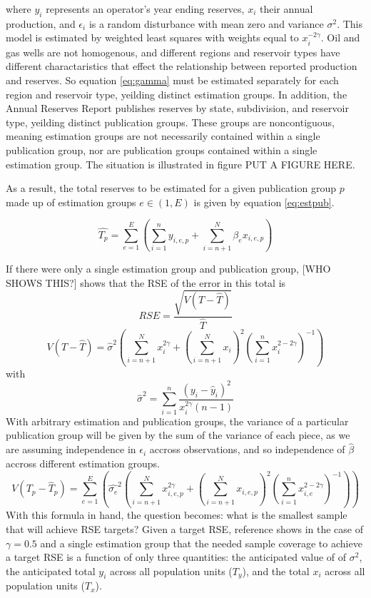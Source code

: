 \documentclass[11pt]{article}\usepackage[]{graphicx}\usepackage[]{color}
\begin{document}
where $y_i$ represents an operator's year ending reserves, $x_i$ their annual production, and $\epsilon_i$ is a random disturbance with mean zero and variance $\sigma^2$. This model is estimated by weighted least squares with weights equal to $x_i^{-2\gamma}$.  Oil and gas wells are not homogenous, and different regions and reservoir types have different charactaristics that effect the relationship between reported production and reserves. So equation \ref{eq:gamma} must be estimated separately for each region and reservoir type, yeilding distinct estimation groups. In addition, the Annual Reserves Report publishes reserves by state, subdivision, and reservoir type, yeilding distinct publication groups. These groups are noncontiguous, meaning estimation groups are not necessarily contained within a single publication group, nor are publication groups contained within a single estimation group. The situation is illustrated in figure PUT A FIGURE HERE. 

As a result, the total reserves to be estimated for a given publication group $p$ made up of estimation groups $e\in (1,E)$ is given by equation 
\ref{eq:estpub}.

\begin{equation} \label{eq:estpub}
\hat{T_p}= \sum_{e=1}^{E} \left( \sum_{i=1}^n y_{i,e,p} + \sum_{i=n+1}^N \hat{\beta_e} x_{i,e,p}\right)
\end{equation}

If there were only a single estimation group and publication group, [WHO SHOWS THIS?] shows that the RSE of the error in this total is 
\[
RSE=\frac{\sqrt{V(T-\hat{T})}}{\hat{T}}
\]
\begin{equation} \label{eq:var}
V(T-\hat{T})=\hat{\sigma}^2 \left(   \sum_{i=n+1}^{N} x_i^{2\gamma} + \left(\sum_{i=n+1}^N x_i\right)^2 \left(\sum_{i=1}^n x_i^{2-2\gamma}\right)^{-1}   \right)
\end{equation}
with
\[
\hat{\sigma}^2=\sum_{i=1}^n \frac{(y_i - \hat{y}_i)^2}{x_i^{2 \gamma}(n-1)}
\]
With arbitrary estimation and publication groups, the variance of a particular publication group will be given by the sum of the variance of each piece, as we are assuming independence in $\epsilon_i$ accross observations, and so independence of $\hat{\beta}$ accross different estimation groups.
\begin{equation} \label{eq:pubvar}
V(T_p-\hat{T}_p) = \sum_{e=1}^{E} \left(\hat{\sigma_e}^2 \left(   \sum_{i=n+1}^{N} x_{i,e,p}^{2\gamma} + \left(\sum_{i=n+1}^N x_{i,e,p}\right)^2 \left(\sum_{i=1}^n x_{i,e}^{2-2\gamma}\right)^{-1}   \right) \right)
\end{equation}
With this formula in hand, the question becomes: what is the smallest sample that will achieve RSE targets? Given a target RSE, reference \cite{Knaub2013} shows in the case of $\gamma=0.5$ and a single estimation group that the needed sample coverage to achieve a target RSE is a function of only three quantities: the anticipated value of of $\sigma^2$, the anticipated total $y_i$ across all population units ($T_y$), and the total $x_i$ across all population units ($T_x$). 
\end{document}
